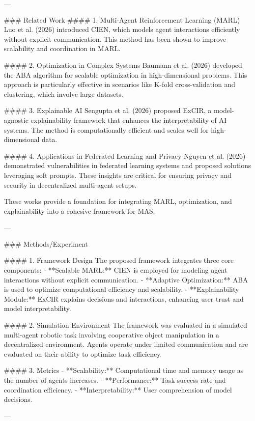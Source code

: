 ---

### Related Work  
#### 1. Multi-Agent Reinforcement Learning (MARL)  
Luo et al. (2026) introduced CIEN, which models agent interactions efficiently without explicit communication. This method has been shown to improve scalability and coordination in MARL.

#### 2. Optimization in Complex Systems  
Baumann et al. (2026) developed the ABA algorithm for scalable optimization in high-dimensional problems. This approach is particularly effective in scenarios like K-fold cross-validation and clustering, which involve large datasets.

#### 3. Explainable AI  
Sengupta et al. (2026) proposed ExCIR, a model-agnostic explainability framework that enhances the interpretability of AI systems. The method is computationally efficient and scales well for high-dimensional data.

#### 4. Applications in Federated Learning and Privacy  
Nguyen et al. (2026) demonstrated vulnerabilities in federated learning systems and proposed solutions leveraging soft prompts. These insights are critical for ensuring privacy and security in decentralized multi-agent setups.

These works provide a foundation for integrating MARL, optimization, and explainability into a cohesive framework for MAS.

---

### Methods/Experiment  

#### 1. Framework Design  
The proposed framework integrates three core components:
- **Scalable MARL:** CIEN is employed for modeling agent interactions without explicit communication.
- **Adaptive Optimization:** ABA is used to optimize computational efficiency and scalability.
- **Explainability Module:** ExCIR explains decisions and interactions, enhancing user trust and model interpretability.

#### 2. Simulation Environment  
The framework was evaluated in a simulated multi-agent robotic task involving cooperative object manipulation in a decentralized environment. Agents operate under limited communication and are evaluated on their ability to optimize task efficiency.

#### 3. Metrics  
- **Scalability:** Computational time and memory usage as the number of agents increases.
- **Performance:** Task success rate and coordination efficiency.
- **Interpretability:** User comprehension of model decisions.

---

